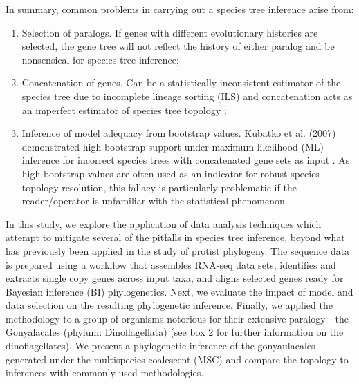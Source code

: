 \documentclass[fleqn,10pt,lineno]{wlpeerj} %
\begin{document}
In summary, common problems in carrying out a species tree inference arise from:\\
\begin{enumerate}[noitemsep]
\item Selection of paralogs. 
If genes with different evolutionary histories are selected, the gene tree will not reflect the history of either paralog and be nonsensical for species tree inference;
\item Concatenation of genes. 
Can be a statistically inconsistent estimator of the species tree due to incomplete lineage sorting (ILS) and concatenation acts as an imperfect estimator of species tree topology \cite{roch2015likelihood};
\item Inference of model adequacy from bootstrap values. 
Kubatko et al. (2007) demonstrated high bootstrap support under maximum likelihood (ML) inference for incorrect species trees with concatenated gene sets as input \cite{kubatko2007inconsistency}. 
As high bootstrap values are often used as an indicator for robust species topology resolution, this fallacy is particularly problematic if the reader/operator is unfamiliar with the statistical phenomenon.
\end{enumerate}

In this study, we explore the application of data analysis techniques which attempt to mitigate several of the pitfalls in species tree inference, beyond what has previously been applied in the study of protist phylogeny.
The sequence data is prepared using a workflow that assembles RNA-seq data sets, identifies and extracts single copy genes across input taxa, and aligns selected
 genes ready for Bayesian inference (BI) phylogenetics.
Next, we evaluate the impact of model and data selection on the resulting phylogenetic inference. 
Finally, we applied the methodology to a group of organisms notorious for their extensive paralogy - the Gonyalacales (phylum: Dinoflagellata) (see box 2 for further information on the dinoflagellates).
We present a phylogenetic inference of the gonyaulacales generated under the multispecies coalescent (MSC) and compare the topology to inferences with commonly used methodologies.
\end{document}
